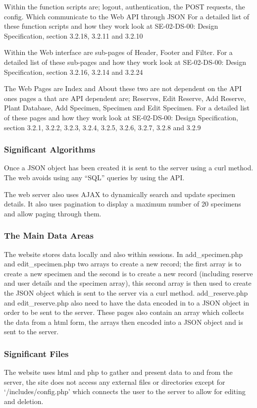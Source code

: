         Within the function scripts are; logout, authentication, the  POST requests, the config. Which communicate to the Web API through JSON For a detailed list of these function scripts and how they work look at SE-02-DS-00: Design Specification, section 3.2.18, 3.2.11 and 3.2.10
    
        Within the Web interface are sub-pages of Header, Footer and Filter. For a detailed list of these sub-pages and how they work look at SE-02-DS-00: Design Specification, section 3.2.16, 3.2.14 and 3.2.24
    
        The Web Pages are Index and About these two are not dependent on the API ones pages a that are API dependent are; Reserves, Edit Reserve, Add Reserve, Plant Database, Add Specimen, Specimen and Edit Specimen. For a detailed list of these pages and how they work look at SE-02-DS-00: Design Specification, section 3.2.1, 3.2.2, 3.2.3, 3.2.4, 3.2.5, 3.2.6, 3.2.7, 3.2.8 and 3.2.9

    \subsubsection{Significant Algorithms}
        Once a JSON object has been created it is sent to the server using a curl method. The web avoids using any ``SQL'' queries by using the API. 

        The web server also uses AJAX to dynamically search and update specimen details. It also uses pagination to display a maximum number of 20 specimens and allow paging through them.
    
    \subsubsection{The Main Data Areas}
        The website stores data locally and also within sessions. In add\_specimen.php and edit\_specimen.php two arrays to create a new record; the first array is to create a new specimen and the second is to create a new record (including reserve and user details and the specimen array), this second array is then used to create the JSON object which is sent to the server via a curl method. add\_reserve.php and edit\_reserve.php also need to have the data encoded in to a JSON object in order to be sent to the server. These pages also contain an array which collects the data from a html form, the arrays then encoded into a JSON object and is sent to the server. 

    \subsubsection{Significant Files}
        The website uses html and php to gather and present data to and from the server, the site does not access any external files or directories except for `/includes/config.php' which connects the user to the server to allow for editing and deletion.

